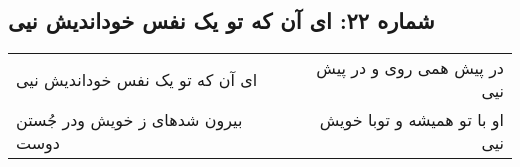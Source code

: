 \begin{center}
\section*{شماره ۲۲: ای آن که تو یک نفس خوداندیش نیی}
\label{sec:022}
\begin{longtable}{l p{0.5cm} r}
ای آن که تو یک نفس خوداندیش نیی
&&
در پیش همی روی و در پیش نیی
\\
بیرون شدهای ز خویش ودر جُستن دوست
&&
او با تو همیشه و توبا خویش نیی
\\
\end{longtable}
\end{center}
